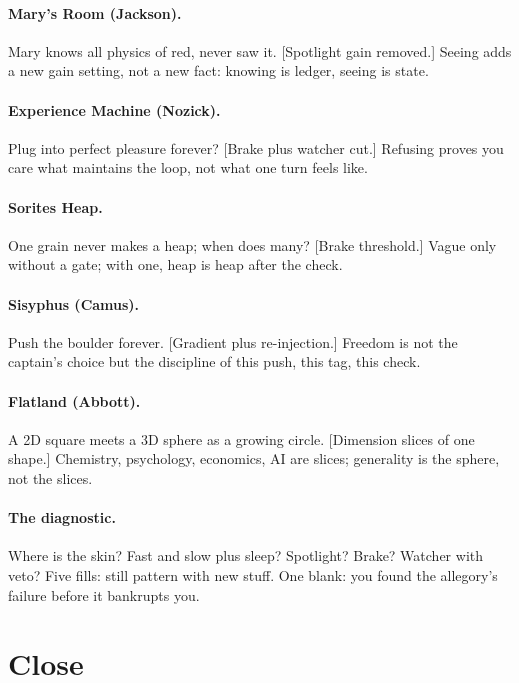 \paragraph{Mary's Room (Jackson).} Mary knows all physics of red, never saw it. [Spotlight gain removed.] Seeing adds a new gain setting, not a new fact: knowing is ledger, seeing is state.

\paragraph{Experience Machine (Nozick).} Plug into perfect pleasure forever? [Brake plus watcher cut.] Refusing proves you care what maintains the loop, not what one turn feels like.

\paragraph{Sorites Heap.} One grain never makes a heap; when does many? [Brake threshold.] Vague only without a gate; with one, heap is heap after the check.

\paragraph{Sisyphus (Camus).} Push the boulder forever. [Gradient plus re-injection.] Freedom is not the captain's choice but the discipline of this push, this tag, this check.

\paragraph{Flatland (Abbott).} A 2D square meets a 3D sphere as a growing circle. [Dimension slices of one shape.] Chemistry, psychology, economics, AI are slices; generality is the sphere, not the slices.

\paragraph{The diagnostic.} Where is the skin? Fast and slow plus sleep? Spotlight? Brake? Watcher with veto? Five fills: still pattern with new stuff. One blank: you found the allegory's failure before it bankrupts you.

\section{Close}
\label{sec:appendix-close}

